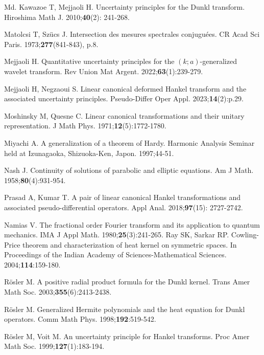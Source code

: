 \documentclass[12pt,a4paper,reqno]{amsproc}
\theoremstyle{definition}
\theoremstyle{remark}
\numberwithin{equation}{section}
\begin{document}
\begin{thebibliography}{Md.}
 Kawazoe T,  Mejjaoli H. Uncertainty principles for the Dunkl transform. Hiroshima Math J. 2010;{\bf{40}}(2): 241-268.

 Matolcsi T, Sz\"ucs J.  Intersection des mesures spectrales conjuguées. CR Acad Sci Paris. 1973;\textbf{277}(841-843), p.8.

 Mejjaoli H.  Quantitative uncertainty principles for the $(k; a)$-generalized wavelet transform. Rev Union Mat Argent. 2022;{\bf{63}}(1):239-279.

  Mejjaoli H,  Negzaoui S.  Linear canonical deformed Hankel transform and the associated uncertainty principles. Pseudo-Differ Oper Appl. 2023;{\bf{14}}(2):p.29.

  Moshinsky M, Quesne C. Linear canonical transformations and their unitary representation. J Math Phys.  1971;\textbf{12}(5):1772-1780.

  Miyachi A. A generalization of a theorem of Hardy. Harmonic Analysis Seminar held at Izunagaoka, Shizuoka-Ken,
Japon. 1997;44-51.

 Nash J.  Continuity of solutions of parabolic and elliptic equations. Am J Math. 1958;\textbf{80}(4):931-954.

 Prasad A, Kumar T. A pair of linear canonical Hankel transformations and associated pseudo-differential operators. Appl Anal. 2018;\textbf{97}(15): 2727-2742.
 
 Namias V. The fractional order Fourier transform and its application to quantum mechanics. IMA J Appl Math. 1980;\textbf{25}(3):241-265.
 Ray SK, Sarkar RP. Cowling-Price theorem and characterization of heat kernel on symmetric spaces. In Proceedings of the Indian Academy of Sciences-Mathematical Sciences. 2004;\textbf{114}:159-180.

  R{\"o}sler M. A positive radial product formula for the Dunkl kernel. Trans Amer Math Soc. 2003;{\bf{355}}(6):2413-2438.

 R{\"o}sler  M. Generalized Hermite polynomials and the heat equation for Dunkl operators. Comm Math Phys. 1998;{\bf{192}}:519-542.

 Rösler M, Voit M. An uncertainty principle for Hankel transforms. Proc Amer Math Soc. 1999;\textbf{127}(1):183-194.



\end{thebibliography}
\end{document}
